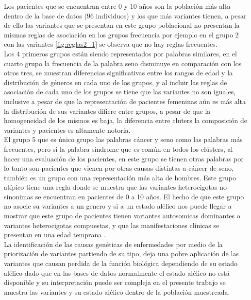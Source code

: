 Los pacientes que se encuentran entre 0 y 10 años son la población más alta dentro de la base de datos (96 individuos)  y los que más variantes tienen, a pesar de ello las variantes que se presentan en este grupo poblacional no presentan la mismas reglas de asociación en los grupos frecuencia por ejemplo en el grupo 2 con las variantes \ref{fig:reglas2_1} se observa que no hay reglas frecuentes.\\ 

Los 4 primeros grupos están siendo representados por palabras similares, en el cuarto grupo la frecuencia de la palabra seno disminuye en comparación con los otros tres, se muestran diferencias significativas entre los rangos de edad y la distribución de géneros en cada uno de los grupos, y al incluir las reglas de asociación de cada uno de los grupos se tiene que las variantes no son iguales, inclusive a pesar de que la representación de pacientes femeninas aún es más alta la distribución de sus variantes difiere entre grupos, a pesar de que la homogeneidad de los mismos es baja, la diferencia entre cluters la composición de variantes y pacientes es altamente notoria.\\  

El grupo 5 que es único grupo las palabras cáncer y seno como las palabras más frecuentes, pero si la palabra síndrome que es común en todos los clústers, al hacer una evaluación de los pacientes, en este grupo se tienen otras palabras por lo tanto son pacientes que vienen por otras causas distintas a cáncer de seno, también es un grupo con una representación más alta de hombres. Este grupo atípico tiene una regla donde se muestra que las variantes heterocigotas no sinonimas se encuentran  en pacientes de 0 a 10 años. El hecho de que este grupo no asocie su variantes a un genero y si a un estado alélico nos puede llegar a mostrar que este grupo de pacientes tienen variantes autosomicas dominantes o variantes heterocigotas compuestas, y que las manifestaciones clínicas se presentan en una edad temprana \cite{Kamphans2013}. \\

La identificación de las causas genéticas de enfermedades por medio de la priorización de variantes partiendo de su tipo, deja una pobre aplicación de las variantes que causan perdida de la función biológica dependiendo de su estado alélico \cite{Eilbeck2017} dado que en las bases de datos normalmente el estado alélico no está disponible y su interpretación puede ser compleja \cite{Stenson2017} en el presente trabajo se muestra las variantes y su estado alélico dentro de la población muestreada. 


